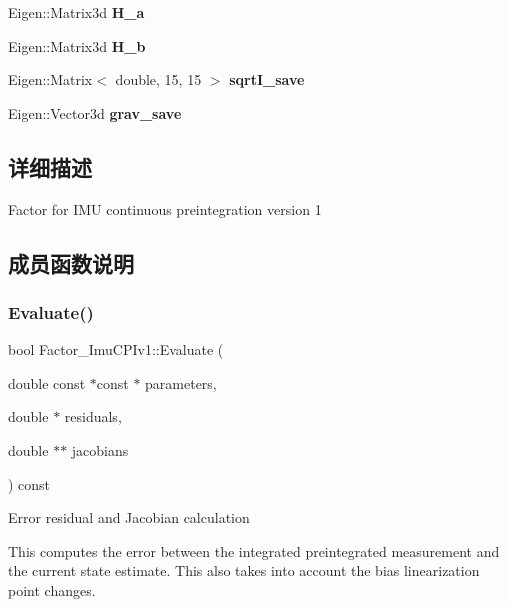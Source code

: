 \begin{DoxyCompactItemize}
Eigen\+::\+Matrix3d {\bfseries H\+\_\+a}
\item 
\mbox{\label{classov__init_1_1Factor__ImuCPIv1_ad25f44b13639e349dea37a3afcc2449b}} 
Eigen\+::\+Matrix3d {\bfseries H\+\_\+b}
\item 
\mbox{\label{classov__init_1_1Factor__ImuCPIv1_a0620f8c734cc1d0412278472987887ae}} 
Eigen\+::\+Matrix$<$ double, 15, 15 $>$ {\bfseries sqrt\+I\+\_\+save}
\item 
\mbox{\label{classov__init_1_1Factor__ImuCPIv1_a2bb9dc2ea616722dde853237772fc782}} 
Eigen\+::\+Vector3d {\bfseries grav\+\_\+save}
\end{DoxyCompactItemize}


\subsection{详细描述}
Factor for I\+MU continuous preintegration version 1 

\subsection{成员函数说明}
\mbox{\label{classov__init_1_1Factor__ImuCPIv1_a76eebef0897757d9978af82b0f256f28}} 
\subsubsection{\texorpdfstring{Evaluate()}{Evaluate()}}
{\footnotesize\ttfamily bool Factor\+\_\+\+Imu\+C\+P\+Iv1\+::\+Evaluate (\begin{DoxyParamCaption}\item[{double const $\ast$const $\ast$}]{parameters,  }\item[{double $\ast$}]{residuals,  }\item[{double $\ast$$\ast$}]{jacobians }\end{DoxyParamCaption}) const\hspace{0.3cm}{\ttfamily [override]}}



Error residual and Jacobian calculation 

This computes the error between the integrated preintegrated measurement and the current state estimate. This also takes into account the bias linearization point changes. 